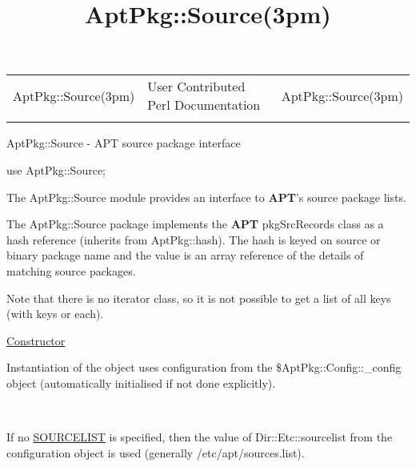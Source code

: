 \documentclass[]{article}
\title{AptPkg::Source(3pm)}
\author{}
\date{}
\let\realtextbf=\textbf
\renewcommand{\textbf}[1]{\textcolor{boldcolor}{\realtextbf{#1}}}
\renewcommand{\emph}[1]{\underline{#1}}
\begin{document}
\maketitle

\begin{longtable}[c]{@{}lll@{}}
\toprule\addlinespace
AptPkg::Source(3pm) & User Contributed Perl Documentation &
AptPkg::Source(3pm)
\\\addlinespace
\bottomrule
\end{longtable}


AptPkg::Source - APT source package interface


use AptPkg::Source;


The AptPkg::Source module provides an interface to \textbf{APT}'s source
package lists.


The AptPkg::Source package implements the \textbf{APT} pkgSrcRecords
class as a hash reference (inherits from AptPkg::hash). The hash is
keyed on source or binary package name and the value is an array
reference of the details of matching source packages.

Note that there is no iterator class, so it is not possible to get a
list of all keys (with keys or each).

\emph{Constructor}

\begin{description}
\itemsep1pt\parskip0pt
\item[new({[}\emph{SOURCELIST}{]})]
Instantiation of the object uses configuration from the
\$AptPkg::Config::\_config object (automatically initialised if not done
explicitly).

~

If no \emph{SOURCELIST} is specified, then the value of
Dir::Etc::sourcelist from the configuration object is used (generally
/etc/apt/sources.list).
\end{description}
\end{document}
